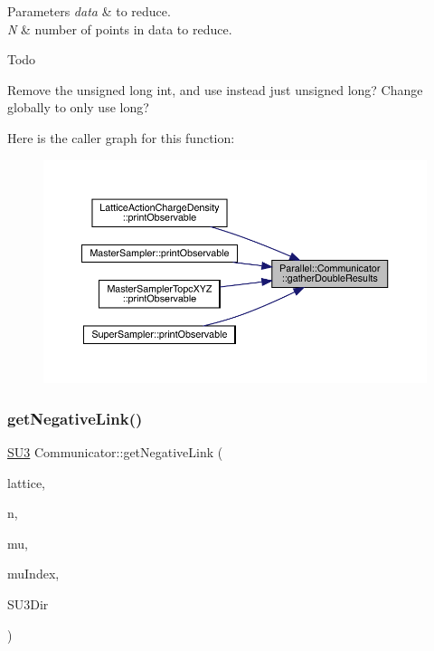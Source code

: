 \begin{DoxyParams}{Parameters}
{\em data} & to reduce. \\
\hline
{\em N} & number of points in data to reduce.\\
\hline
\end{DoxyParams}
\begin{DoxyRefDesc}{Todo}
\item[\mbox{\hyperlink{todo__todo000008}{Todo}}]Remove the unsigned long int, and use instead just unsigned long? Change globally to only use long? \end{DoxyRefDesc}
Here is the caller graph for this function\+:
\nopagebreak
\begin{figure}[H]
\begin{center}
\leavevmode
\includegraphics[width=350pt]{class_parallel_1_1_communicator_ae5739683ff54a7c39af6e37920e70ea5_icgraph}
\end{center}
\end{figure}
\mbox{\label{class_parallel_1_1_communicator_ae843d16f4aed13d5b5179a05b717ec88}} 
\subsubsection{\texorpdfstring{getNegativeLink()}{getNegativeLink()}}
{\footnotesize\ttfamily \mbox{\hyperlink{class_s_u3}{S\+U3}} Communicator\+::get\+Negative\+Link (\begin{DoxyParamCaption}\item[{\mbox{\hyperlink{class_lattice}{Lattice}}$<$ \mbox{\hyperlink{class_s_u3}{S\+U3}} $>$ $\ast$}]{lattice,  }\item[{std\+::vector$<$ int $>$}]{n,  }\item[{int}]{mu,  }\item[{int $\ast$}]{mu\+Index,  }\item[{int}]{S\+U3\+Dir }\end{DoxyParamCaption})\hspace{0.3cm}{\ttfamily [static]}}



